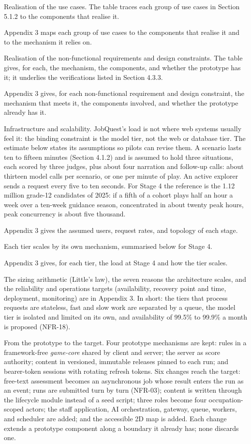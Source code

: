 Realisation of the use cases. The table traces each group of use cases in Section 5.1.2 to the components that realise it.

Appendix 3 maps each group of use cases to the components that realise it and to the mechanism it relies on.

Realisation of the non-\allowbreak{}functional requirements and design constraints. The table gives, for each, the mechanism, the components, and whether the prototype has it; it underlies the verifications listed in Section 4.3.3.

Appendix 3 gives, for each non-\allowbreak{}functional requirement and design constraint, the mechanism that meets it, the components involved, and whether the prototype already has it.

Infrastructure and scalability. JobQuest's load is not where web systems usually feel it: the binding constraint is the model tier, not the web or database tier. The estimate below states its assumptions so pilots can revise them. A scenario lasts ten to fifteen minutes (Section 4.1.2) and is assumed to hold three situations, each scored by three judges, plus about four narration and follow-up calls: about thirteen model calls per scenario, or one per minute of play. An active explorer sends a request every five to ten seconds. For Stage 4 the reference is the 1.12 million grade-12 candidates of 2025\cite{r167}: if a fifth of a cohort plays half an hour a week over a ten-week guidance season, concentrated in about twenty peak hours, peak concurrency is about five thousand.

Appendix 3 gives the assumed users, request rates, and topology of each stage.

Each tier scales by its own mechanism, summarised below for Stage 4.

Appendix 3 gives, for each tier, the load at Stage 4 and how the tier scales.

The sizing arithmetic (Little's law), the seven reasons the architecture scales, and the reliability and operations targets (availability, recovery point and time, deployment, monitoring) are in Appendix 3. In short: the tiers that process requests are stateless, fast and slow work are separated by a queue, the model tier is isolated and limited on its own, and availability of 99.5\% to 99.9\% a month is proposed (NFR-18).

From the prototype to the target. Four prototype mechanisms are kept: rules in a framework-\allowbreak{}free \textit{game-core} shared by client and server; the server as score authority; content in versioned, immutable releases pinned to each run; and bearer-\allowbreak{}token sessions with rotating refresh tokens. Six changes reach the target: free-text assessment becomes an asynchronous job whose result enters the run as an event; runs are submitted turn by turn (NFR-03); content is written through the lifecycle module instead of a seed script; three roles become four occupation-\allowbreak{}scoped actors; the staff application, AI orchestration, gateway, queue, workers, and scheduler are added; and the accessible 2D map is added. Each change extends a prototype component along a boundary it already has; none discards one.

